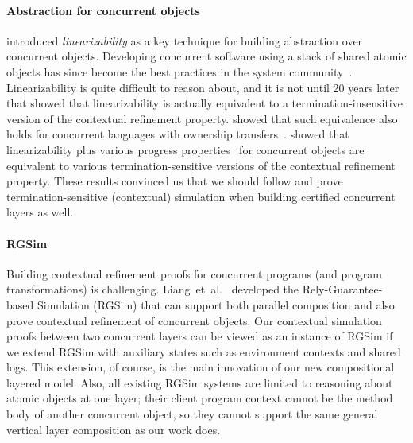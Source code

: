 \paragraph{Abstraction for concurrent objects}
\citet{herlihy90} introduced {\em linearizability} as a key technique
for building abstraction over concurrent objects. Developing
concurrent software using a stack of shared atomic objects has since
become the best practices in the system
community~\cite{Herlihy08book,ospp11}. Linearizability is quite
difficult to reason about, and it is not until 20 years later that
\citet{filipovic10} showed that linearizability is actually equivalent
to a termination-insensitive version of the contextual refinement
property. \citet{Gotsman12concur} showed that such equivalence also
holds for concurrent languages with ownership
transfers~\cite{ohearn:concur04}.  \citet{liang13,lili16} showed that
linearizability plus various progress properties~\cite{Herlihy08book}
for concurrent objects are equivalent to various termination-sensitive
versions of the contextual refinement property. These results
convinced us that we should follow \citet{dscal15} and prove
termination-sensitive (contextual) simulation when building certified
concurrent layers as well.

\paragraph{RGSim} Building contextual refinement proofs
for concurrent programs (and program transformations) is challenging.
Liang~{et~al.}~\cite{RGSim,Liang14lics,lili16} developed the
Rely-Guarantee-based Simulation (RGSim) that can support both parallel
composition and also prove contextual refinement of concurrent
objects. Our contextual simulation proofs between two concurrent
layers can be viewed as an instance of RGSim if we extend RGSim with
auxiliary states such as environment contexts and shared logs. This
extension, of course, is the main innovation of our new compositional
layered model. Also, all existing RGSim systems are limited to reasoning
about atomic objects at one layer; their client program context cannot
be the method body of another concurrent object, so they cannot
support the same general vertical layer composition as our work does.


